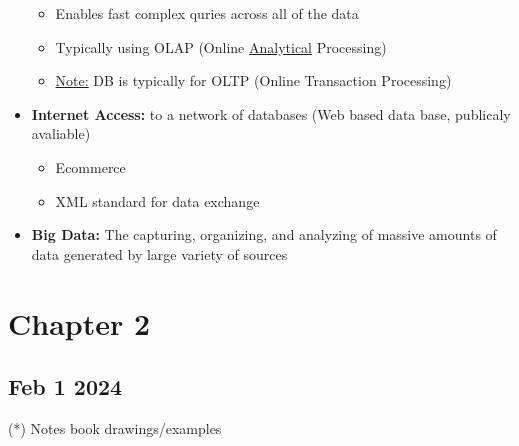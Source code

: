 \documentclass[12pt]{article}
\begin{document}
\begin{itemize}
\begin{itemize}
								\item Enables fast complex quries across all of the data
								\item Typically using OLAP (Online \underline{Analytical} Processing)
								\item \underline{Note:} DB is typically for OLTP (Online Transaction Processing)
					 \end{itemize}
		  \item \textbf{Internet Access:} to a network of databases (Web based data base, publicaly avaliable)
					 \begin{itemize}
								\item Ecommerce
								\item XML standard for data exchange
					 \end{itemize}
		  \item \textbf{Big Data:} The capturing, organizing, and analyzing of massive amounts of data
					 generated by large variety of sources
\end{itemize}

\section{Chapter 2}

\subsection*{Feb 1 2024}

(*) Notes book drawings/examples
\end{document}
